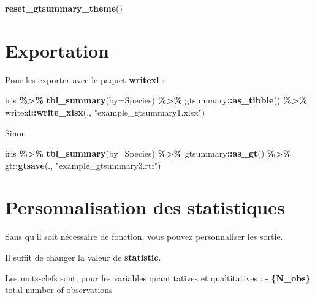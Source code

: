 \documentclass[
]{book}
\newenvironment{Shaded}{\begin{snugshade}}{\end{snugshade}}
\newcommand{\AttributeTok}[1]{\textcolor[rgb]{0.13,0.29,0.53}{#1}}
\newcommand{\FunctionTok}[1]{\textcolor[rgb]{0.13,0.29,0.53}{\textbf{#1}}}
\newcommand{\NormalTok}[1]{#1}
\newcommand{\SpecialCharTok}[1]{\textcolor[rgb]{0.81,0.36,0.00}{\textbf{#1}}}
\newcommand{\StringTok}[1]{\textcolor[rgb]{0.31,0.60,0.02}{#1}}
\begin{document}
\begin{Shaded}
\begin{Highlighting}[]
\FunctionTok{reset\_gtsummary\_theme}\NormalTok{()}
\end{Highlighting}
\end{Shaded}

\section{Exportation}\label{exportation}

Pour les exporter avec le paquet \textbf{writexl} :

\begin{Shaded}
\begin{Highlighting}[]
\NormalTok{iris }\SpecialCharTok{\%\textgreater{}\%} \FunctionTok{tbl\_summary}\NormalTok{(}\AttributeTok{by=}\NormalTok{Species) }\SpecialCharTok{\%\textgreater{}\%}
\NormalTok{  gtsummary}\SpecialCharTok{::}\FunctionTok{as\_tibble}\NormalTok{() }\SpecialCharTok{\%\textgreater{}\%} 
\NormalTok{  writexl}\SpecialCharTok{::}\FunctionTok{write\_xlsx}\NormalTok{(., }\StringTok{"example\_gtsummary1.xlsx"}\NormalTok{)}
\end{Highlighting}
\end{Shaded}

Sinon

\begin{Shaded}
\begin{Highlighting}[]
\NormalTok{iris }\SpecialCharTok{\%\textgreater{}\%} \FunctionTok{tbl\_summary}\NormalTok{(}\AttributeTok{by=}\NormalTok{Species) }\SpecialCharTok{\%\textgreater{}\%}
\NormalTok{  gtsummary}\SpecialCharTok{::}\FunctionTok{as\_gt}\NormalTok{() }\SpecialCharTok{\%\textgreater{}\%} 
\NormalTok{  gt}\SpecialCharTok{::}\FunctionTok{gtsave}\NormalTok{(., }\StringTok{"example\_gtsummary3.rtf"}\NormalTok{)}
\end{Highlighting}
\end{Shaded}

\section{Personnalisation des statistiques}\label{personnalisation-des-statistiques}

Sans qu'il soit nécessaire de fonction, vous pouvez personnaliser les sortie.

Il suffit de changer la valeur de \textbf{statistic}.

Les mots-clefs sont, pour les variables quantitatives et qualtitatives :
- \textbf{\{N\_obs\}} total number of observations
\end{document}

